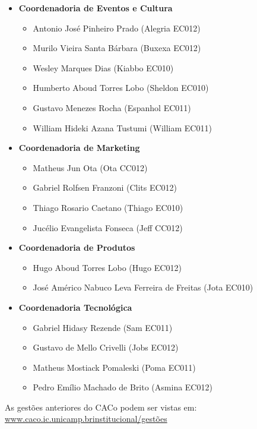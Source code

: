 \begin{itemize}
\item   \textbf{Coordenadoria de Eventos e Cultura}
        \begin{itemize}
        \item Antonio José Pinheiro Prado (Alegria EC012)
        \item Murilo Vieira Santa Bárbara (Buxexa EC012)
        \item Wesley Marques Dias (Kiabbo EC010)
        \item Humberto Aboud Torres Lobo (Sheldon EC010)
        \item Gustavo Menezes Rocha (Espanhol EC011)
        \item William Hideki Azana Tustumi (William EC011)
        \end{itemize}

\item   \textbf{Coordenadoria de Marketing}
        \begin{itemize}
        \item Matheus Jun Ota (Ota CC012)
        \item Gabriel Rolfsen Franzoni (Clits EC012)
        \item Thiago Rosario Caetano (Thiago EC010)
        \item Jucélio Evangelista Fonseca (Jeff CC012)
        \end{itemize}

\item   \textbf{Coordenadoria de Produtos}
        \begin{itemize}
        \item Hugo Aboud Torres Lobo (Hugo EC012)
        \item José Américo Nabuco Leva Ferreira de Freitas (Jota EC010)
        \end{itemize}

\item   \textbf{Coordenadoria Tecnológica}
        \begin{itemize}
        \item Gabriel Hidasy Rezende (Sam EC011)
        \item Gustavo de Mello Crivelli (Jobs EC012)
        \item Matheus Mostiack Pomaleski (Poma EC011)
        \item Pedro Emílio Machado de Brito (Asmina EC012)
        \end{itemize}

\end{itemize}

As gestões anteriores do CACo podem ser vistas em:
\url{www.caco.ic.unicamp.brinstitucional/gestões}